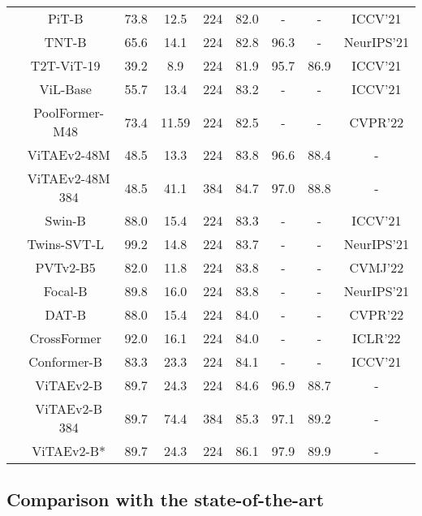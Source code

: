 \documentclass[twocolumn]{svjour3}          \smartqed  \usepackage{natbib}
\begin{document}
\begin{table*}[htbp]
{\begin{tabular}{c|c|ccc|cc|c|c}
          & PiT-B~\citep{heo2021rethinking} & 73.8  & 12.5  & 224   & 82.0  & -     & - & ICCV'21 \\
          & TNT-B~\citep{han2021transformer} & 65.6  & 14.1  & 224   & 82.8  & 96.3  & - & NeurIPS'21 \\
          & T2T-ViT-19~\citep{yuan2021tokens} & 39.2  & 8.9   & 224   & 81.9  & 95.7  & 86.9 & ICCV'21 \\
        & ViL-Base~\citep{zhang2021multi} & 55.7  &  13.4 & 224   & 83.2  & - & - & ICCV'21 \\
        & PoolFormer-M48~\citep{yu2022metaformer} &  73.4 & 11.59 & 224 & 82.5 & - & - & CVPR'22 \\
          & {ViTAEv2-48M} &    48.5   &    13.3   & 224   & 83.8 & 96.6 & 88.4 & - \\
          & {ViTAEv2-48M  384} &  48.5   &   41.1    & 384   & 84.7 & 97.0 & 88.8 & -  \\
        \cline{2-9}
          & Swin-B~\citep{liu2021swin} & 88.0  & 15.4 & 224   & 83.3  & - & - & ICCV'21 \\
          & Twins-SVT-L~\citep{chu2021twins} & 99.2  & 14.8 & 224   & 83.7  & - & - & NeurIPS'21 \\
          & PVTv2-B5~\citep{wang2021pvtv2} & 82.0  & 11.8 & 224   & 83.8  & - & - & CVMJ'22 \\
          & Focal-B~\citep{yang2021focal} & 89.8  & 16.0 & 224   & 83.8  & - & - &  NeurIPS'21 \\
          & DAT-B~\citep{xia2022vision} & 88.0  & 15.4 & 224   & 84.0  & - & - & CVPR'22 \\
          & CrossFormer~\citep{wang2021crossformer} & 92.0  & 16.1 & 224   & 84.0  & - & - & ICLR'22 \\
          & Conformer-B~\citep{peng2021conformer} & 83.3  & 23.3 & 224   & 84.1  & - & - & ICCV'21 \\
          & {ViTAEv2-B} & 89.7  &   24.3    & 224   & 84.6  & 96.9  & 88.7 & - \\
          & {ViTAEv2-B  384} & 89.7  &     74.4  & 384   & 85.3  & 97.1  & 89.2 & - \\
          & {ViTAEv2-B*} & 89.7  &  24.3  &   224 &   86.1    & 97.9 & 89.9 & -\\
          \hline
    \end{tabular}}\label{tab:ViTAESuppSota1}\end{table*}

\subsection{Comparison with the state-of-the-art}
\end{document}
